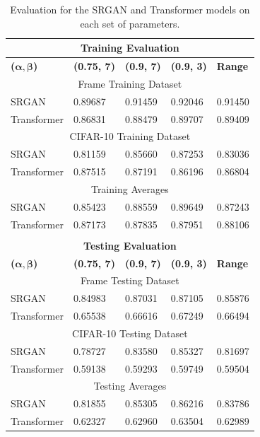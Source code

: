 \documentclass[letterpaper]{article} %
\begin{document}
\begin{table}[t]
\begin{centering}
\bgroup
\def\arraystretch{1.5}
\begin{tabular}{| m{} | m{} | m{} | m{} | m{}|} 
\hline
\multicolumn{5}{|c|}{\textbf{Training Evaluation}} \\
\hline
\textbf{($\boldsymbol{\alpha},\boldsymbol{\beta}$)} & \textbf{(0.75, 7)} & \textbf{(0.9, 7)} & \textbf{(0.9, 3)} & \textbf{Range} \\ 
\hline
\hline
\multicolumn{5}{|c|}{Frame Training Dataset} \\
\hline
SRGAN & 0.89687 & 0.91459 & 0.92046 & 0.91450 \\
\hline
Transformer & 0.86831 & 0.88479 & 0.89707 & 0.89409 \\
\hline
\multicolumn{5}{|c|}{CIFAR-10 Training Dataset} \\
\hline
SRGAN & 0.81159 & 0.85660 & 0.87253 & 0.83036 \\
\hline
Transformer & 0.87515 & 0.87191 & 0.86196 & 0.86804 \\
\hline
\multicolumn{5}{|c|}{Training Averages} \\
\hline
SRGAN & 0.85423 & 0.88559 & 0.89649 & 0.87243 \\
\hline
Transformer & 0.87173 & 0.87835 & 0.87951 & 0.88106 \\
\hline
\multicolumn{5}{c}{} \\
\hline
\multicolumn{5}{|c|}{\textbf{Testing Evaluation}} \\
\hline
\textbf{($\boldsymbol{\alpha},\boldsymbol{\beta}$)} & \textbf{(0.75, 7)} & \textbf{(0.9, 7)} & \textbf{(0.9, 3)} & \textbf{Range} \\ 
\hline
\hline
\multicolumn{5}{|c|}{Frame Testing Dataset} \\
\hline
SRGAN & 0.84983 & 0.87031 & 0.87105 & 0.85876 \\
\hline
Transformer & 0.65538 & 0.66616 & 0.67249 & 0.66494 \\
\hline
\multicolumn{5}{|c|}{CIFAR-10 Testing Dataset} \\
\hline
SRGAN & 0.78727 & 0.83580 & 0.85327 & 0.81697 \\
\hline
Transformer & 0.59138 & 0.59293 & 0.59749 & 0.59504 \\
\hline
\multicolumn{5}{|c|}{Testing Averages} \\
\hline
SRGAN & 0.81855 & 0.85305 & 0.86216 & 0.83786 \\
\hline
Transformer & 0.62327 & 0.62960 & 0.63504 & 0.62989 \\
\hline
\end{tabular}
\bigskip
\caption{Evaluation for the SRGAN and Transformer models on each set of parameters.}
\label{tbl:enhancement}
\egroup
\end{centering}
\end{table}
\end{document}

